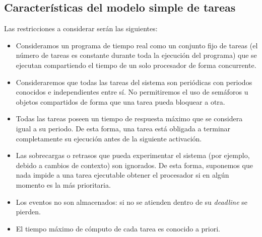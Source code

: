 \subsection{Características del modelo simple de tareas}
Las restricciones a considerar serán las siguientes:
\begin{itemize}
    \item Consideramos un programa de tiempo real como un conjunto fijo de tareas (el número de tareas es constante durante toda la ejecución del programa) que se ejecutan compartiendo el tiempo de un solo procesador de forma concurrente.
    \item Consideraremos que todas las tareas del sistema son periódicas con periodos conocidos e independientes entre sí. No permitiremos el uso de semáforos u objetos compartidos de forma que una tarea pueda bloquear a otra.
    \item Todas las tareas poseen un tiempo de respuesta máximo que se considera igual a su periodo. De esta forma, una tarea está obligada a terminar completamente su ejecución antes de la siguiente activación.
    \item Las sobrecargas o retrasos que pueda experimentar el sistema (por ejemplo, debido a cambios de contexto) son ignorados. De esta forma, suponemos que nada impide a una tarea ejecutable obtener el procesador si en algún momento es la más prioritaria.
    \item Los eventos no son almacenados: si no se atienden dentro de su \textit{deadline} se pierden.
    \item El tiempo máximo de cómputo de cada tarea es conocido a priori.
\end{itemize}


